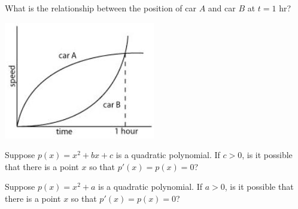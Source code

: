 \documentclass{ximera}
\newcommand{\recommendation}[1]{}
\newcommand{\PCA}[1]{}
\begin{document}
\begin{problem}
  \recommendation{Elizabeth}
  \PCA{\#8}
  
  What is the relationship between the position of car $A$ and car $B$
  at $t=1$ hr?
  \begin{image}
    \includegraphics[scale = 1]{speed}%
  \end{image}
  \begin{multipleChoice}
  \end{multipleChoice}
\end{problem}



\begin{problem}
  Suppose $p(x) = x^2 + bx + c$ is a quadratic polynomial.  If $c > 0$, is it possible that there is a point $x$ so that $p'(x) = p(x) = 0$?
  \begin{multipleChoice}
  \end{multipleChoice}
\end{problem}

\begin{problem}
  Suppose $p(x) = x^2 + a$ is a quadratic polynomial.  If $a > 0$, is it possible that there is a point $x$ so that $p'(x) = p(x) = 0$?
  \begin{multipleChoice}
  \end{multipleChoice}
\end{problem}

\end{document}
